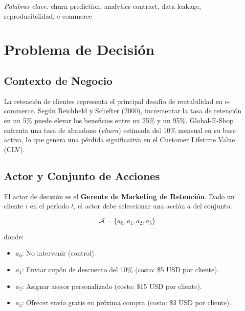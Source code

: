 \documentclass[12pt,a4paper]{article}
\begin{document}
\vspace{0.5em}

\noindent\textit{Palabras clave:} churn prediction, analytics contract, data leakage, reproducibilidad, e-commerce

\newpage


\section{Problema de Decisión}

\subsection{Contexto de Negocio}

La retención de clientes representa el principal desafío de rentabilidad en e-commerce. Según Reichheld y Schefter (2000), incrementar la tasa de retención en un 5\% puede elevar los beneficios entre un 25\% y un 95\%. Global-E-Shop enfrenta una tasa de abandono (\textit{churn}) estimada del 10\% mensual en su base activa, lo que genera una pérdida significativa en el Customer Lifetime Value (CLV).

\subsection{Actor y Conjunto de Acciones}

El actor de decisión es el \textbf{Gerente de Marketing de Retención}. Dado un cliente $i$ en el período $t$, el actor debe seleccionar una acción $a$ del conjunto:

\begin{equation}
\mathcal{A} = \{a_0, a_1, a_2, a_3\}
\end{equation}

donde:
\begin{itemize}
    \item $a_0$: No intervenir (control).
    \item $a_1$: Enviar cupón de descuento del 10\% (costo: \$5 USD por cliente).
    \item $a_2$: Asignar asesor personalizado (costo: \$15 USD por cliente).
    \item $a_3$: Ofrecer envío gratis en próxima compra (costo: \$3 USD por cliente).
\end{itemize}
\end{document}
